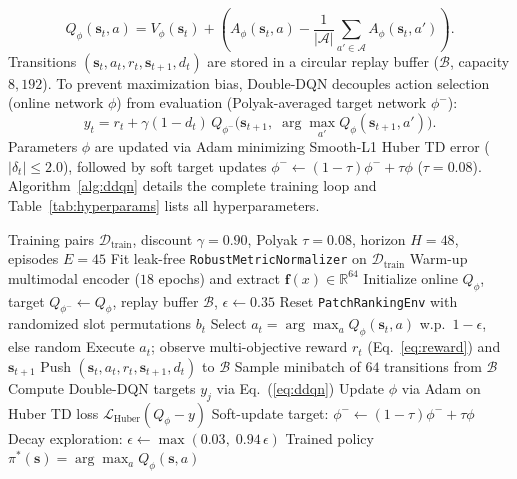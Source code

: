 \documentclass[conference]{IEEEtran}
\begin{document}
\begin{itemize}
    \begin{equation}
        Q_\phi(\mathbf{s}_t, a) = V_\phi(\mathbf{s}_t) + \left(A_\phi(\mathbf{s}_t, a) - \frac{1}{|\mathcal{A}|}\sum_{a'\in\mathcal{A}} A_\phi(\mathbf{s}_t, a')\right).
    \end{equation}
    Transitions $(\mathbf{s}_t, a_t, r_t, \mathbf{s}_{t+1}, d_t)$ are stored in a circular replay buffer ($\mathcal{B}$, capacity $8{,}192$). To prevent maximization bias, Double-DQN decouples action selection (online network $\phi$) from evaluation (Polyak-averaged target network $\phi^-$):
    \begin{equation}
        y_t = r_t + \gamma (1 - d_t)\, Q_{\phi^-}\!\Big(\mathbf{s}_{t+1},\; \arg\max_{a'} Q_\phi(\mathbf{s}_{t+1}, a')\Big).
        \label{eq:ddqn}
    \end{equation}
    Parameters $\phi$ are updated via Adam minimizing Smooth-L1 Huber TD error ($|\delta_t|\le 2.0$), followed by soft target updates $\phi^- \leftarrow (1-\tau)\phi^- + \tau\phi$ ($\tau = 0.08$). Algorithm~\ref{alg:ddqn} details the complete training loop and Table~\ref{tab:hyperparams} lists all hyperparameters.
\end{itemize}

\begin{algorithm}[t]
\caption{Multi-Objective Dueling Double-DQN for Patch Triage}
\label{alg:ddqn}
\begin{algorithmic}[1]
\Require Training pairs $\mathcal{D}_{\text{train}}$, discount $\gamma=0.90$, Polyak $\tau=0.08$, horizon $H=48$, episodes $E=45$
\State Fit leak-free \texttt{RobustMetricNormalizer} on $\mathcal{D}_{\text{train}}$
\State Warm-up multimodal encoder ($18$ epochs) and extract $\mathbf{f}(x)\in\mathbb{R}^{64}$
\State Initialize online $Q_\phi$, target $Q_{\phi^-} \leftarrow Q_\phi$, replay buffer $\mathcal{B}$, $\epsilon \leftarrow 0.35$
    \State Reset \texttt{PatchRankingEnv} with randomized slot permutations $b_t$
        \State Select $a_t = \arg\max_a Q_\phi(\mathbf{s}_t, a)$ w.p.\ $1-\epsilon$, else random
        \State Execute $a_t$; observe multi-objective reward $r_t$ (Eq.~\ref{eq:reward}) and $\mathbf{s}_{t+1}$
        \State Push $(\mathbf{s}_t, a_t, r_t, \mathbf{s}_{t+1}, d_t)$ to $\mathcal{B}$
            \State Sample minibatch of $64$ transitions from $\mathcal{B}$
            \State Compute Double-DQN targets $y_j$ via Eq.~(\ref{eq:ddqn})
            \State Update $\phi$ via Adam on Huber TD loss $\mathcal{L}_{\text{Huber}}(Q_\phi - y)$
            \State Soft-update target: $\phi^- \leftarrow (1-\tau)\phi^- + \tau\phi$
        \EndIf
    \EndFor
    \State Decay exploration: $\epsilon \leftarrow \max(0.03,\; 0.94\,\epsilon)$
\EndFor
\State \Return Trained policy $\pi^*(\mathbf{s}) = \arg\max_a Q_\phi(\mathbf{s}, a)$
\end{algorithmic}
\end{algorithm}
\end{document}
